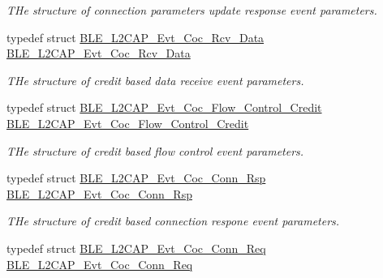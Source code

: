 \begin{DoxyCompactItemize}
\begin{DoxyCompactList}\small\item\em T\+He structure of connection parameters update response event parameters. \end{DoxyCompactList}\item 
typedef struct \hyperlink{struct_b_l_e___l2_c_a_p___evt___coc___rcv___data}{B\+L\+E\+\_\+\+L2\+C\+A\+P\+\_\+\+Evt\+\_\+\+Coc\+\_\+\+Rcv\+\_\+\+Data} \hyperlink{group___b_l_e___l2_c_a_p_gac6ec358e1577ed62cc8806df1a0df05f}{B\+L\+E\+\_\+\+L2\+C\+A\+P\+\_\+\+Evt\+\_\+\+Coc\+\_\+\+Rcv\+\_\+\+Data}\hypertarget{group___b_l_e___l2_c_a_p_gac6ec358e1577ed62cc8806df1a0df05f}{}\label{group___b_l_e___l2_c_a_p_gac6ec358e1577ed62cc8806df1a0df05f}

\begin{DoxyCompactList}\small\item\em T\+He structure of credit based data receive event parameters. \end{DoxyCompactList}\item 
typedef struct \hyperlink{struct_b_l_e___l2_c_a_p___evt___coc___flow___control___credit}{B\+L\+E\+\_\+\+L2\+C\+A\+P\+\_\+\+Evt\+\_\+\+Coc\+\_\+\+Flow\+\_\+\+Control\+\_\+\+Credit} \hyperlink{group___b_l_e___l2_c_a_p_ga89c5e8793f41460e28686920cd99004d}{B\+L\+E\+\_\+\+L2\+C\+A\+P\+\_\+\+Evt\+\_\+\+Coc\+\_\+\+Flow\+\_\+\+Control\+\_\+\+Credit}\hypertarget{group___b_l_e___l2_c_a_p_ga89c5e8793f41460e28686920cd99004d}{}\label{group___b_l_e___l2_c_a_p_ga89c5e8793f41460e28686920cd99004d}

\begin{DoxyCompactList}\small\item\em T\+He structure of credit based flow control event parameters. \end{DoxyCompactList}\item 
typedef struct \hyperlink{struct_b_l_e___l2_c_a_p___evt___coc___conn___rsp}{B\+L\+E\+\_\+\+L2\+C\+A\+P\+\_\+\+Evt\+\_\+\+Coc\+\_\+\+Conn\+\_\+\+Rsp} \hyperlink{group___b_l_e___l2_c_a_p_ga6999949954d04c69cdb4c644ffe7696c}{B\+L\+E\+\_\+\+L2\+C\+A\+P\+\_\+\+Evt\+\_\+\+Coc\+\_\+\+Conn\+\_\+\+Rsp}\hypertarget{group___b_l_e___l2_c_a_p_ga6999949954d04c69cdb4c644ffe7696c}{}\label{group___b_l_e___l2_c_a_p_ga6999949954d04c69cdb4c644ffe7696c}

\begin{DoxyCompactList}\small\item\em T\+He structure of credit based connection respone event parameters. \end{DoxyCompactList}\item 
typedef struct \hyperlink{struct_b_l_e___l2_c_a_p___evt___coc___conn___req}{B\+L\+E\+\_\+\+L2\+C\+A\+P\+\_\+\+Evt\+\_\+\+Coc\+\_\+\+Conn\+\_\+\+Req} \hyperlink{group___b_l_e___l2_c_a_p_gaedec180e18b44718aca06750414ce89b}{B\+L\+E\+\_\+\+L2\+C\+A\+P\+\_\+\+Evt\+\_\+\+Coc\+\_\+\+Conn\+\_\+\+Req}\hypertarget{group___b_l_e___l2_c_a_p_gaedec180e18b44718aca06750414ce89b}{}\label{group___b_l_e___l2_c_a_p_gaedec180e18b44718aca06750414ce89b}


\end{DoxyCompactItemize}
